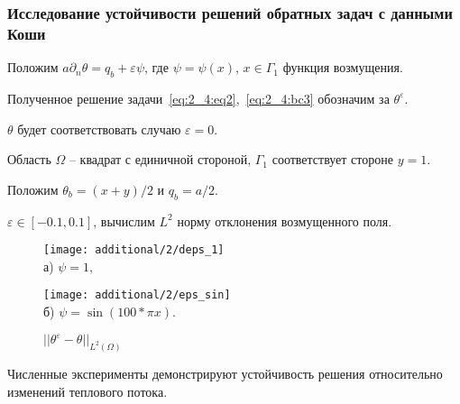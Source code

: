 \begin{frame}
    \frametitle{Исследование устойчивости решений обратных задач с данными Коши}
    Положим $a\partial_n \theta = q_b +\varepsilon \psi$, где $\psi = \psi(x)$, $x \in \Gamma_1$ функция возмущения.

    Полученное решение задачи~\eqref{eq:2_4:eq2},~\eqref{eq:2_4:bc3} обозначим за $\theta^{\varepsilon}$.

    $\theta$ будет соответствовать случаю $\varepsilon = 0$.

    Область $\Omega$ -- квадрат с единичной стороной, $\Gamma_1$ соответствует стороне $y = 1$.

    Положим $\theta_b = (x + y) / 2$ и $q_b = a / 2$.

    $\varepsilon \in [-0.1, 0.1]$, вычислим $L^2$ норму отклонения возмущенного поля.
    \begin{figure}[h!t]
        \begin{minipage}[b][][b]{0.49\linewidth}
            \centering
            \texttt{[image: additional/2/deps\_1]}\\ а) $\psi = 1,$
        \end{minipage}
        \hfill
        \begin{minipage}[b][][b]{0.49\linewidth}
            \centering
            \texttt{[image: additional/2/eps\_sin]} \\ б) $\psi = \sin (100 * \pi x)$.
        \end{minipage}
        \caption{$||\theta^\varepsilon - \theta||_{L^2(\Omega)}$}
        \label{fig:4_4:vareps}
    \end{figure}

    Численные эксперименты демонстрируют
    устойчивость решения относительно изменений теплового потока.
\end{frame}
